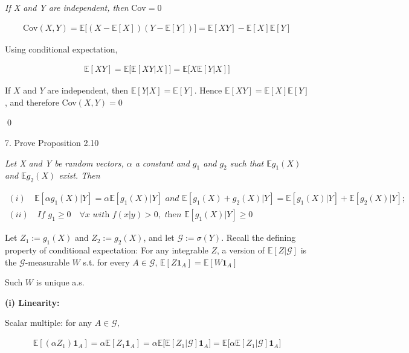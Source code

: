 \documentclass[10pt]{article}
\begin{document}
\textit{If X and Y are independent, then} $\text{Cov} = 0$

\begin{gather*}
    \text{Cov}(X, Y) = \mathbb{E}\big[(X - \mathbb{E}[X])(Y - \mathbb{E}[Y])\big] = \mathbb{E}[XY] - \mathbb{E}[X]\mathbb{E}[Y]
\end{gather*}

Using conditional expectation,

\begin{gather*}
    \mathbb{E}[XY] = \mathbb{E}\big[\mathbb{E}[XY | X]\big] = \mathbb{E}\big[X \mathbb{E}[Y | X]\big]
\end{gather*}

If $X$ and $Y$ are independent, then $\mathbb{E}[Y | X] = \mathbb{E}[Y]$. Hence $\mathbb{E}[XY] = \mathbb{E}[X]\mathbb{E}[Y]$, and therefore Cov$(X, Y) = 0$ 

\qed

7. Prove Proposition 2.10

\textit{Let X and Y be random vectors, $\alpha$ a constant and $g_1$ and $g_2$ such that $\mathbb{E}g_1(X)$ and $\mathbb{E}g_2(X)$ exist. Then}

\begin{gather*}
    (i)\quad \mathbb{E}[\alpha g_1(X) | Y] = \alpha \mathbb{E}[g_1(X) | Y] \textit{ and } \mathbb{E}[g_1(X) + g_2(X) | Y] = \mathbb{E}[g_1(X) | Y] + \mathbb{E}[g_2(X) | Y]; \\
    (ii)\quad \textit{If } g_1 \geq 0\quad \forall x \textit{ with } f(x|y) > 0, \textit{ then } \mathbb{E}[g_1(X)|Y] \geq 0
\end{gather*}

Let $Z_1 := g_1(X)$ and $Z_2 := g_2(X)$, and let $\mathcal{G} := \sigma(Y)$. Recall the defining property of conditional expectation: For any integrable $Z$, a version 
of $\mathbb{E}[Z|\mathcal{G}]$ is the $\mathcal{G}$-measurable $W$ s.t. for every $A \in \mathcal{G}$, $\mathbb{E}[Z \mathbf{1}_A] = \mathbb{E}[W \mathbf{1}_A]$

Such $W$ is unique a.s.

\textbf{(i) Linearity:}

Scalar multiple: for any $A \in \mathcal{G},$

\begin{gather*}
    \mathbb{E}[(\alpha Z_1)\mathbf{1}_A] = \alpha \mathbb{E}[Z_1 \mathbf{1}_A] = \alpha \mathbb{E}\big[\mathbb{E}[Z_1|\mathcal{G}]\mathbf{1}_A\big] = \mathbb{E}\big[\alpha \mathbb{E}[Z_1 | \mathcal{G}]\mathbf{1}_A\big]
\end{gather*}
\end{document}
